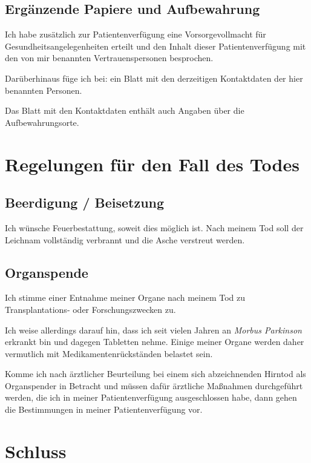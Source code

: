\documentclass[pdftex,12pt,a4paper]{article}
\begin{document}
\subsection{Ergänzende Papiere und Aufbewahrung}


Ich habe zusätzlich zur Patientenverfügung eine Vorsorgevollmacht
für Gesundheitsangelegenheiten erteilt und den Inhalt dieser Patientenverfügung mit
den von mir benannten Vertrauenspersonen besprochen. 

Darüberhinaus füge ich bei: ein Blatt mit den derzeitigen Kontaktdaten der hier benannten Personen.

Das Blatt mit den Kontaktdaten enthält auch Angaben über die 
Aufbewahrungsorte.


\section{Regelungen für den Fall des Todes}

\subsection{Beerdigung / Beisetzung}

Ich wünsche Feuerbestattung, soweit dies möglich ist. Nach meinem Tod soll
der Leichnam vollständig verbrannt und die Asche verstreut werden.

\subsection{Organspende}

Ich stimme einer Entnahme meiner Organe nach meinem Tod zu 
Transplantations- oder Forschungszwecken zu.

Ich weise allerdings darauf hin, dass ich seit vielen Jahren an \textit{Morbus Parkinson} erkrankt
bin und dagegen Tabletten nehme. Einige meiner Organe werden daher
vermutlich mit Medikamentenrückständen belastet sein.

Komme ich nach ärztlicher Beurteilung bei einem sich abzeichnenden Hirntod als Organspender in Betracht und müssen dafür ärztliche Maßnahmen durchgeführt werden, die ich in meiner Patientenverfügung ausgeschlossen habe, dann gehen die Bestimmungen in meiner Patientenverfügung vor.


\section{Schluss}
\end{document}
